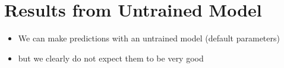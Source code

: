 \documentclass[letterpaper,10pt,english]{sphinxmanual}
\begin{document}
\noindent{}


\section{Results from Untrained Model}
\label{\detokenize{05-SupervisedSegmentation:results-from-untrained-model}}\begin{itemize}
\item {} 
\sphinxAtStartPar
We can make predictions with an untrained model (default parameters)

\item {} 
\sphinxAtStartPar
but we clearly do not expect them to be very good

\end{itemize}
\end{document}
